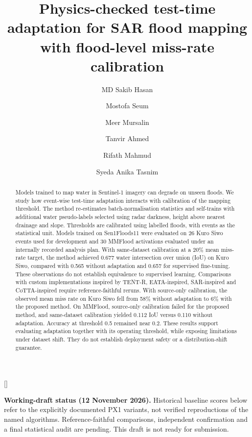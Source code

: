 \documentclass[a4paper,fleqn]{cas-sc}
\begin{document}
\let\WriteBookmarks\relax
\def\floatpagepagefraction{1}
\def\textpagefraction{.001}
\let\printorcid\relax


\title [mode = title]{Physics-checked test-time adaptation for SAR flood mapping with flood-level miss-rate calibration}

\author[1]{MD Sakib Hasan}
\author[1]{Mostofa Seum}
\author[1]{Meer Mursalin}
\author[1]{Tanvir Ahmed}[]
\cormark[1]
\author[1]{Rifath Mahmud}
\author[1]{Syeda Anika Tasnim}



\begin{abstract}
Models trained to map water in Sentinel-1 imagery can degrade on unseen floods. We study how event-wise test-time adaptation interacts with calibration of the mapping threshold. The method re-estimates batch-normalisation statistics and self-trains with additional water pseudo-labels selected using radar darkness, height above nearest drainage and slope. Thresholds are calibrated using labelled floods, with events as the statistical unit. Models trained on Sen1Floods11 were evaluated on 26 Kuro Siwo events used for development and 30 MMFlood activations evaluated under an internally recorded analysis plan. With same-dataset calibration at a 20\% mean miss-rate target, the method achieved 0.677 water intersection over union (IoU) on Kuro Siwo, compared with 0.565 without adaptation and 0.657 for supervised fine-tuning. These observations do not establish equivalence to supervised learning. Comparisons with custom implementations inspired by TENT-R, EATA-inspired, SAR-inspired and CoTTA-inspired require reference-faithful reruns. With source-only calibration, the observed mean miss rate on Kuro Siwo fell from 58\% without adaptation to 6\% with the proposed method. On MMFlood, source-only calibration failed for the proposed method, and same-dataset calibration yielded 0.112 IoU versus 0.110 without adaptation. Accuracy at threshold 0.5 remained near 0.2. These results support evaluating adaptation together with its operating threshold, while exposing limitations under dataset shift. They do not establish deployment safety or a distribution-shift guarantee.
\end{abstract}
\noindent\textbf{Working-draft status (12 November 2026).} Historical baseline scores below refer to the explicitly documented PX1 variants, not verified reproductions of the named algorithms. Reference-faithful comparisons, independent confirmation and a final statistical audit are pending. This draft is not ready for submission.
\end{document}
